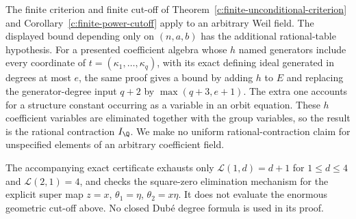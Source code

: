 \begin{remark}
\label{c:uniform-arity-scope}
The finite criterion and finite cut-off of
Theorem~\ref{c:finite-unconditional-criterion} and
Corollary~\ref{c:finite-power-cutoff} apply to an arbitrary
Weil field.  The displayed bound depending only on $(n,a,b)$
has the additional rational-table hypothesis.  For a presented
coefficient algebra whose $h$ named generators include every
coordinate of $t=(\kappa_1,\ldots,\kappa_q)$, with its exact
defining ideal generated in degrees at most $e$, the same proof gives a bound by adding
$h$ to $E$ and replacing the generator-degree input $q+2$
by $\max(q+3,e+1)$.  The extra one accounts for a structure
constant occurring as a variable in an orbit equation.  These
$h$ coefficient variables are eliminated together with the group
variables, so the result is the rational contraction $I_\Q$.
We make no uniform rational-contraction claim for unspecified
elements of an arbitrary coefficient field.

The accompanying exact certificate exhausts only
$\mathcal L(1,d)=d+1$ for $1\leq d\leq4$ and
$\mathcal L(2,1)=4$, and checks the square-zero elimination
mechanism for the explicit super map
$z=x$, $\theta_1=\eta$, $\theta_2=x\eta$.
It does not evaluate the enormous geometric cut-off above.
No closed Dub\'e degree formula is used in its proof.
\end{remark}
